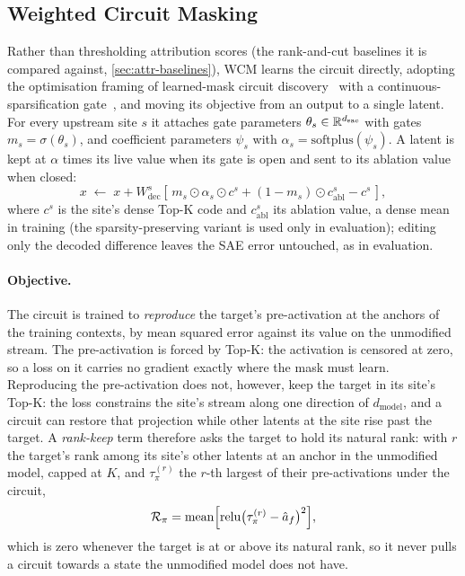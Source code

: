 \documentclass[10pt]{article}
\begin{document}
\subsection{Weighted Circuit Masking}
\label{sec:ablmask}

Rather than thresholding attribution scores (the rank-and-cut baselines it is compared against, \cref{sec:attr-baselines}), WCM learns the circuit directly, adopting the optimisation framing of learned-mask circuit discovery~\citep{bhaskar2024finding, caples2025scaling} with a continuous-sparsification gate~\citep{savarese2020winning}, and moving its objective from an output to a single latent.
For every upstream site $s$ it attaches gate parameters $\theta_s \in \mathbb{R}^{d_{\mathrm{sae}}}$ with gates $m_s = \sigma(\theta_s)$, and coefficient parameters $\psi_s$ with $\alpha_s = \mathrm{softplus}(\psi_s)$.
A latent is kept at $\alpha$ times its live value when its gate is open and sent to its ablation value when closed:
\[
    x \;\leftarrow\; x + W_{\mathrm{dec}}^{s}\!\left[\, m_s \odot \alpha_s \odot c^{s} + (1 - m_s) \odot c^{s}_{\mathrm{abl}} - c^{s} \,\right],
\]
where $c^{s}$ is the site's dense Top-K code and $c^{s}_{\mathrm{abl}}$ its ablation value, a dense mean in training (the sparsity-preserving variant is used only in evaluation); editing only the decoded difference leaves the SAE error untouched, as in evaluation.

\paragraph{Objective.}
The circuit is trained to \emph{reproduce} the target's pre-activation at the anchors of the training contexts, by mean squared error against its value on the unmodified stream.
The pre-activation is forced by Top-K: the activation is censored at zero, so a loss on it carries no gradient exactly where the mask must learn.
Reproducing the pre-activation does not, however, keep the target in its site's Top-K: the loss constrains the site's stream along one direction of $d_{\mathrm{model}}$, and a circuit can restore that projection while other latents at the site rise past the target.
A \emph{rank-keep} term therefore asks the target to hold its natural rank: with $r$ the target's rank among its site's other latents at an anchor in the unmodified model, capped at $K$, and $\tau^{(r)}_{\pi}$ the $r$-th largest of their pre-activations under the circuit,
\[
    \mathcal{R}_{\pi} = \operatorname{mean}\Bigl[\operatorname{relu}\bigl(\tau^{(r)}_{\pi} - \hat{a}_f\bigr)^{2}\Bigr],
\]
which is zero whenever the target is at or above its natural rank, so it never pulls a circuit towards a state the unmodified model does not have.
\end{document}
